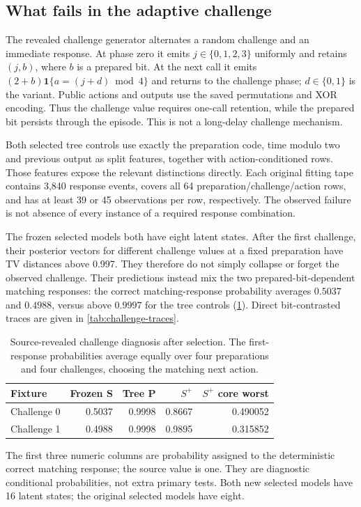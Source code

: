 \subsection{What fails in the adaptive challenge}\label{p3:s05}
The revealed challenge generator alternates a random challenge and an immediate response. At phase zero it emits $j\in\{0,1,2,3\}$ uniformly and retains $(j,b)$, where $b$ is a prepared bit. At the next call it emits $(2+b)\mathbf1\{a=(j+d)\bmod4\}$ and returns to the challenge phase; $d\in\{0,1\}$ is the variant. Public actions and outputs use the saved permutations and XOR encoding. Thus the challenge value requires one-call retention, while the prepared bit persists through the episode. This is not a long-delay challenge mechanism.

Both selected tree controls use exactly the preparation code, time modulo two and previous output as split features, together with action-conditioned rows. Those features expose the relevant distinctions directly. Each original fitting tape contains 3,840 response events, covers all 64 preparation/challenge/action rows, and has at least 39 or 45 observations per row, respectively. The observed failure is not absence of every instance of a required response combination.

The frozen selected models both have eight latent states. After the first challenge, their posterior vectors for different challenge values at a fixed preparation have TV distances above 0.997. They therefore do not simply collapse or forget the observed challenge. Their predictions instead mix the two prepared-bit-dependent matching responses: the correct matching-response probability averages $0.5037$ and $0.4988$, versus above $0.9997$ for the tree controls (\cref{tab:challenge-diagnostic}). Direct bit-contrasted traces are given in \cref{tab:challenge-traces}.


\begin{table}[tbp]
\centering\caption{Source-revealed challenge diagnosis after selection. The first-response probabilities average equally over four preparations and four challenges, choosing the matching next action.}\label{tab:challenge-diagnostic}
\small\begin{tabular}{@{}lrrrr@{}}\toprule
Fixture & Frozen S & Tree P & $S^+$ & $S^+$ core worst\\\midrule
Challenge 0 & 0.5037 & 0.9998 & 0.8667 & 0.490052\\
Challenge 1 & 0.4988 & 0.9998 & 0.9895 & 0.315852\\\bottomrule
\end{tabular}
\par\smallskip\footnotesize The first three numeric columns are probability assigned to the deterministic correct matching response; the source value is one. They are diagnostic conditional probabilities, not extra primary tests. Both new selected models have 16 latent states; the original selected models have eight.
\end{table}

